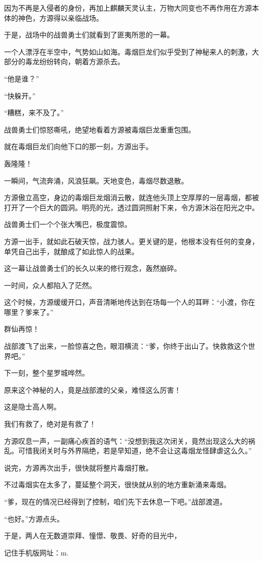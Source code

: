 \begin{this_body}
因为不再是入侵者的身份，再加上麒麟天灵认主，万物大同变也不再作用在方源本体的神色，方源得以亲临战场。

于是，战场中的战兽勇士们就看到了匪夷所思的一幕。

一个人漂浮在半空中，气势如山如海。毒烟巨龙们似乎受到了神秘来人的刺激，大部分的毒龙纷纷转向，朝着方源杀去。

“他是谁？”

“快躲开。”

“糟糕，来不及了。”

战兽勇士们惊怒嘶吼，绝望地看着方源被毒烟巨龙重重包围。

就在毒烟巨龙们向他下口的那一刻，方源出手。

轰隆隆！

一瞬间，气流奔涌，风浪狂飙。天地变色，毒烟尽数退散。

方源傲立高空，身边的毒烟巨龙烟消云散，就连他头顶上空厚厚的一层毒烟，都被打开了一个巨大的圆洞。明亮的光，透过圆洞照射下来，令方源沐浴在阳光之中。

战兽勇士们一个个张大嘴巴，极度震惊。

方源一出手，就如此石破天惊，战力骇人。更关键的是，他根本没有任何的变身，单凭自己出手，就酿成了如此惊人的战果。

这一幕让战兽勇士们的长久以来的修行观念，轰然崩碎。

一时间，众人都陷入了茫然。

这个时候，方源缓缓开口，声音清晰地传达到在场每一个人的耳畔：“小渡，你在哪里？爹来了。”

群仙再惊！

战部渡飞了出来，一脸惊喜之色，眼泪横流：“爹，你终于出山了。快救救这个世界吧。”

下一刻，整个星罗城哗然。

原来这个神秘的人，竟是战部渡的父亲，难怪这么厉害！

这是隐士高人啊。

我们有救了，绝对是有救了！

方源叹息一声，一副痛心疾首的语气：“没想到我这次闭关，竟然出现这么大的祸乱。可惜我闭关时与外界隔绝，若是早知道，绝不会让这毒烟龙怪肆虐这么久。”

说完，方源再次出手，很快就将整片毒烟打散。

不过毒烟实在太多了，蔓延整个洞天，很快就从别的地方重新涌来毒烟。

“爹，现在的情况已经得到了控制，咱们先下去休息一下吧。”战部渡道。

“也好。”方源点头。

于是，两人在无数道崇拜、憧憬、敬畏、好奇的目光中，

记住手机版网址：m.

\end{this_body}

